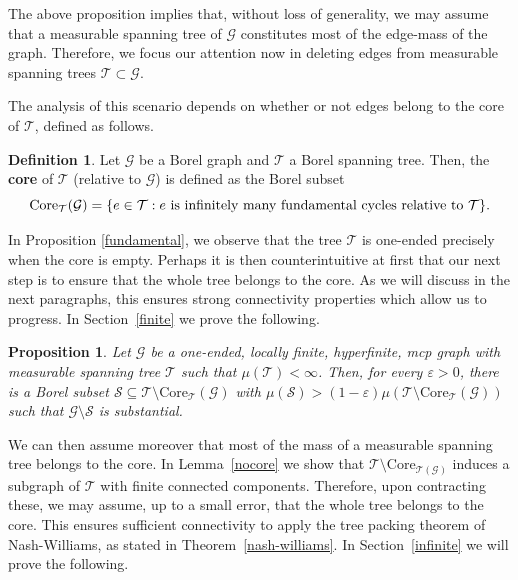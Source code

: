 \documentclass[letterpaper,11pt,reqno]{amsart}
\theoremstyle{bfnote}
\newtheorem{prop}[theorem]{Proposition}
\theoremstyle{definition}
\newtheorem{definition}[theorem]{Definition}
\newcommand{\0}{\varnothing}
\numberwithin{equation}{section}
\begin{document}
The above proposition implies that, without loss of generality, we may assume that a measurable spanning tree of $\mathcal G$ constitutes most of the edge-mass of the graph. Therefore, we focus our attention now in deleting edges from measurable spanning trees $\mathcal T \subset \mathcal G$. 

The analysis of this scenario depends on whether or not edges belong to the core of $\mathcal T$, defined as follows. 

\begin{definition}\label{def:core}
 Let $\mathcal G$ be a Borel graph and $\mathcal T$ a Borel spanning tree. Then, the \textbf{core} of $\mathcal T$ (relative to $\mathcal G$) is defined as the Borel subset
    $$
    \mathrm{Core}_\mathcal{T}(\mathcal{G})=\{e\in \mathcal{T}: e \textnormal{ is infinitely many fundamental cycles relative to } \mathcal{T}\}.
    $$
\end{definition}

In Proposition \ref{fundamental}, we observe that the tree $\mathcal T$ is one-ended precisely when the core is empty. Perhaps it is then counterintuitive at first that our next step is to ensure that the whole tree belongs to the core. As we will discuss in the next paragraphs, this ensures strong connectivity properties which allow us to progress. In Section~\ref{finite} we prove the following. 

\begin{prop}\label{boundary connectivity}
    Let $\mathcal{G}$ be a one-ended, locally finite, hyperfinite, mcp graph with measurable spanning tree $\mathcal{T}$ such that $\mu (\mathcal T) < \infty$. Then, for every $\varepsilon>0$, there is a Borel subset $\mathcal{S}\subseteq \mathcal{T}\setminus \mathrm{Core}_\mathcal{T} (\mathcal{G})$ with $\mu(\mathcal S)>(1-\varepsilon)\mu(\mathcal{T}\setminus \mathrm{Core}_\mathcal{T} (\mathcal{G}))$ such that $\mathcal{G}\setminus \mathcal{S}$ is substantial.
\end{prop} 

We can then assume moreover that most of the mass of a measurable spanning tree belongs to the core. In Lemma~\ref{nocore} we show that $\mathcal{T}\setminus \mathrm{Core}_\mathcal{T(G)}$ induces a subgraph of $\mathcal T$ with finite connected components. Therefore, upon contracting these, we may assume, up to a small error, that the whole tree belongs to the core. This ensures sufficient connectivity to apply the tree packing theorem of Nash-Williams, as stated in Theorem~\ref{nash-williams}. In Section~\ref{infinite} we will prove the following. 
\end{document}
